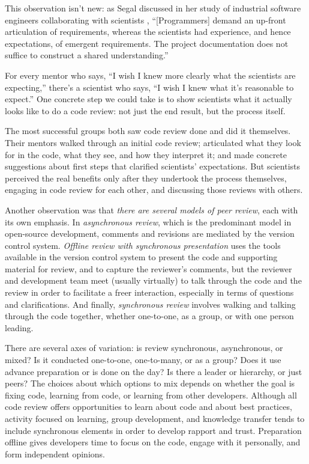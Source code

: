\documentclass[10pt,twocolumn]{article}
\begin{document}
This observation isn't new:
as Segal discussed in her study of industrial software engineers collaborating with scientists \cite{b:segal2005},
``[Programmers] demand an up-front articulation of requirements,
whereas the scientists had experience, and hence expectations, of emergent requirements.
The project documentation does not suffice to construct a shared understanding.''

For every mentor who says,
``I wish I knew more clearly what the scientists are expecting,''
there's a scientist who says,
``I wish I knew what it's reasonable to expect.''
One concrete step we could take is to show scientists what it actually looks like to do a code review:
not just the end result, but the process itself.

The most successful groups both saw code review done and did it themselves.
Their mentors walked through an initial code review;
articulated what they look for in the code, what they see, and how they interpret it;
and made concrete suggestions about first steps that clarified scientists' expectations.
But scientists perceived the real benefits only after they undertook the process themselves,
engaging in code review for each other,
and discussing those reviews with others.

Another observation was that \emph{there are several models of peer review},
each with its own emphasis.
In \emph{asynchronous review},
which is the predominant model in open-source development,
comments and revisions are mediated by the version control system.
\emph{Offline review with synchronous presentation}
uses the tools available in the version control system to present the code and supporting material for review,
and to capture the reviewer’s comments,
but the reviewer and development team meet (usually virtually) to talk through the code and the review
in order to facilitate a freer interaction,
especially in terms of questions and clarifications.
And finally,
\emph{synchronous review}
involves walking and talking through the code together,
whether one-to-one, as a group, or with one person leading.

There are several axes of variation:
is review synchronous, asynchronous, or mixed?
Is it conducted one-to-one, one-to-many, or as a group?
Does it use advance preparation or is done on the day?
Is there a leader or hierarchy, or just peers?
The choices about which options to mix depends on whether the goal is
fixing code, learning from code, or learning from other developers.
Although all code review offers opportunities to learn about code and about best practices,
activity focused on learning, group development, and knowledge transfer tends to include synchronous elements
in order to develop rapport and trust.
Preparation offline gives developers time to focus on the code,
engage with it personally,
and form independent opinions. 
\end{document}
